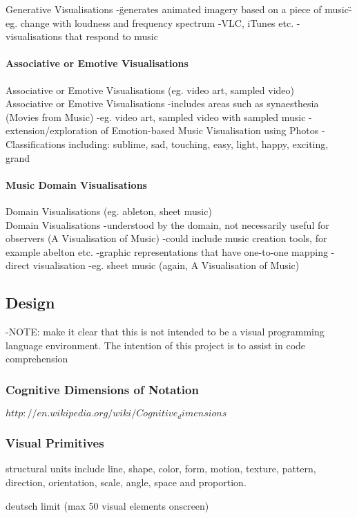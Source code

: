 Generative Visualisations
-\"generates animated imagery based on a piece of music\"
-eg. change with loudness and frequency spectrum
-VLC, iTunes etc.
-visualisations that respond to music

\paragraph{Associative or Emotive Visualisations}
Associative or Emotive Visualisations (eg. video art, sampled video)\\

Associative or Emotive Visualisations
-includes areas such as synaesthesia (Movies from Music)
-eg. video art, sampled video with sampled music
-extension/exploration of Emotion-based Music Visualisation using Photos
-Classifications including: sublime, sad, touching, easy, light, happy, exciting, grand


\paragraph{Music Domain Visualisations}
Domain Visualisations (eg. ableton, sheet music)\\

Domain Visualisations
-understood by the domain, not necessarily useful for observers (A Visualisation of Music)
-could include music creation tools, for example abelton etc.
-graphic representations that have one-to-one mapping
-direct visualisation
-eg. sheet music (again, A Visualisation of Music)




\subsection{Design}

-NOTE: make it clear that this is not intended to be a visual programming language environment. The intention of this project is to assist in code comprehension 

\subsubsection{Cognitive Dimensions of Notation}
$http://en.wikipedia.org/wiki/Cognitive_dimensions$

\subsubsection{Visual Primitives}

structural units include line, shape, color, form, motion, texture, pattern, direction, orientation, scale, angle, space and proportion.

deutsch limit (max 50 visual elements onscreen)


